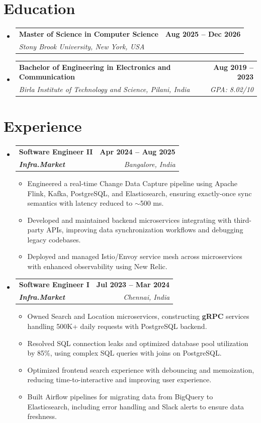 \documentclass[letterpaper,11pt]{article}
\makeatletter
\newcommand{\resumeItem}[1]{
  \item\small{
    {#1 \vspace{-2pt}}
  }
}
\newcommand{\resumeSubheading}[4]{
  \vspace{-2pt}\item
    \begin{tabular*}{1.0\textwidth}[t]{l@{\extracolsep{\fill}}r}
      \textbf{#1} & \textbf{\small #2} \\
      \textit{\small#3} & \textit{\small #4} \\
    \end{tabular*}\vspace{-7pt}
}
\newcommand{\resumeSubHeadingListStart}{\begin{itemize}[leftmargin=0.0in, label={}]}
\newcommand{\resumeSubHeadingListEnd}{\end{itemize}}
\newcommand{\resumeItemListStart}{\begin{itemize}}
\newcommand{\resumeItemListEnd}{\end{itemize}\vspace{-5pt}}
\makeatother
\begin{document}
\section{Education}
  \resumeSubHeadingListStart
    \resumeSubheading
      {Master of Science in Computer Science}{Aug 2025 -- Dec 2026}
      {Stony Brook University, New York, USA}{}
    \resumeSubheading
      {Bachelor of Engineering in Electronics and Communication}{Aug 2019 -- 2023}
      {Birla Institute of Technology and Science, Pilani, India}{GPA: 8.02/10}
  \resumeSubHeadingListEnd
\vspace{-12pt}

\section{Experience}
  \resumeSubHeadingListStart

    \resumeSubheading
      {\textbf{Software Engineer II}}{\textbf{Apr 2024 -- Aug 2025}}
      {\textbf{Infra.Market}}{Bangalore, India}
      \resumeItemListStart
        \resumeItem{Engineered a real-time Change Data Capture pipeline using Apache Flink, Kafka, PostgreSQL, and Elasticsearch, ensuring exactly-once sync semantics with latency reduced to $\sim$500 ms.}
        \resumeItem{Developed and maintained backend microservices integrating with third-party APIs, improving data synchronization workflows and debugging legacy codebases.}
        \resumeItem{Deployed and managed Istio/Envoy service mesh across microservices with enhanced observability using New Relic.}
      \resumeItemListEnd

    \resumeSubheading
      {\textbf{Software Engineer I}}{\textbf{Jul 2023 -- Mar 2024}}
      {\textbf{Infra.Market}}{Chennai, India}
      \resumeItemListStart
        \resumeItem{Owned Search and Location microservices, constructing \textbf{gRPC} services handling 500K+ daily requests with PostgreSQL backend.}
        \resumeItem{Resolved SQL connection leaks and optimized database pool utilization by 85\%, using complex SQL queries with joins on PostgreSQL.}
        \resumeItem{Optimized frontend search experience with debouncing and memoization, reducing time-to-interactive and improving user experience.}
        \resumeItem{Built Airflow pipelines for migrating data from BigQuery to Elasticsearch, including error handling and Slack alerts to ensure data freshness.}
      \resumeItemListEnd

  \resumeSubHeadingListEnd
\vspace{-12pt}
\end{document}

